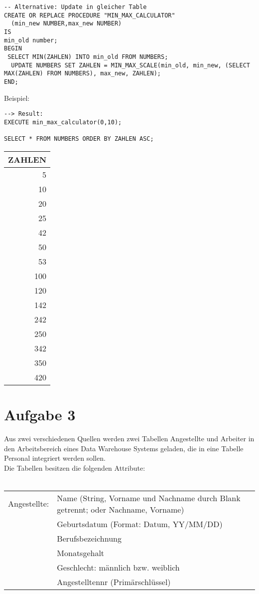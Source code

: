 \documentclass{scrartcl}
\begin{document}
\begin{lstlisting}
-- Alternative: Update in gleicher Table
CREATE OR REPLACE PROCEDURE "MIN_MAX_CALCULATOR" 
  (min_new NUMBER,max_new NUMBER)
IS
min_old number;
BEGIN
 SELECT MIN(ZAHLEN) INTO min_old FROM NUMBERS;
  UPDATE NUMBERS SET ZAHLEN = MIN_MAX_SCALE(min_old, min_new, (SELECT MAX(ZAHLEN) FROM NUMBERS), max_new, ZAHLEN);
END;
\end{lstlisting}
Beispiel:
\begin{lstlisting}
--> Result: 
EXECUTE min_max_calculator(0,10);

SELECT * FROM NUMBERS ORDER BY ZAHLEN ASC;
\end{lstlisting}
\begin{tabular}{|r|}
\hline
 ZAHLEN \\
\hline
    5   \\
   10   \\
   20   \\
   25   \\
   42   \\
   50   \\
   53   \\
  100   \\
  120   \\
  142   \\
  242   \\
  250   \\
  342   \\
  350   \\
  420   \\
\hline
\end{tabular}

\newpage

\section*{Aufgabe 3}
Aus zwei verschiedenen Quellen werden zwei Tabellen Angestellte und Arbeiter
in den Arbeitsbereich eines Data Warehouse Systems geladen, die in eine
Tabelle Personal integriert werden sollen.\\
Die Tabellen besitzen die folgenden
Attribute:\\ \\
\begin{tabular}{l l}
Angestellte: & Name (String, Vorname und Nachname durch Blank
 getrennt; oder Nachname, Vorname) \\
 & Geburtsdatum (Format: Datum, YY/MM/DD) \\
 & Berufsbezeichnung \\
 & Monatsgehalt \\
 & Geschlecht: männlich bzw. weiblich \\
 & Angestelltennr (Primärschlüssel) \\
\end{tabular}
\end{document}

